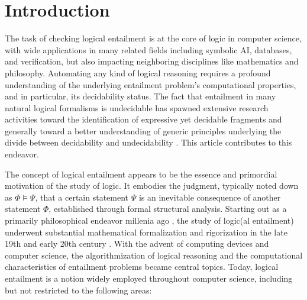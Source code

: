 
%
\section{Introduction}

The task of checking logical entailment is at the core of logic in computer science, with wide applications in many related fields including symbolic AI, databases, and veri\-fi\-ca\-tion, but also impacting neighboring disciplines like mathematics and philosophy.
Automating any kind of logical reasoning 
requires a profound understanding of the underlying entailment problem's computational properties, and in particular, its de\-ci\-da\-bi\-li\-ty status. The fact that entailment in many natural logical formalisms is undecidable has spawned  extensive research activities toward the identification of expressive yet decidable fragments and generally toward a better understanding of generic principles underlying the divide between decidability and undecidability \cite{BorgerGG1997,Vardi96,Gradel01,PrattHartmann23}. This article contributes to this endeavor.

\medskip

The concept of logical entailment appears to be the essence and primordial motivation of the study of logic. It embodies the judgment, typically noted down as $\Phi \models \Psi$, that a certain statement $\Psi$ is an inevitable consequence of another statement $\Phi$, established through formal structural analysis. Starting out as a primarily philosophical endeavor  millenia ago \cite{PriorAnalytics}, the study of logic(\hspace{-1pt}al entailment) underwent substantial mathematical formalization and rigorization in the late 19th and early 20th century \cite{Boole1854,Frege1879,Tarski1943}. With the advent of computing devices and computer science, the algorithmization of logical reasoning and the computational characteristics of entailment problems became central topics. Today, logical entailment is a notion widely employed throughout computer science, including but not restricted to the following areas:      

